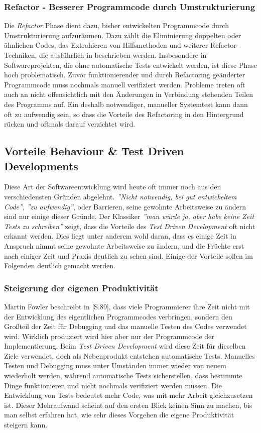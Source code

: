 \subsubsection{Refactor - Besserer Programmcode durch
  Umstrukturierung}
Die \textit{Refactor} Phase dient dazu, bisher entwickelten
Programmcode durch Umstrukturierung aufzuräumen. Dazu zählt die
Eliminierung doppelten oder ähnlichen Codes, das Extrahieren von
Hilfsmethoden und weiterer Refactor-Techniken, die ausführlich in
\cite{Fowler1999} beschrieben werden. Insbesondere in
Softwareprojekten, die ohne automatische Tests entwickelt werden, ist
diese Phase hoch problematisch. Zuvor funktionierender und durch
Refactoring geänderter Programmcode muss nochmals manuell verifiziert
werden. Probleme treten oft auch an nicht offensichtlich mit den
Änderungen in Verbindung stehenden Teilen des Programms auf. Ein
deshalb notwendiger, manueller Systemtest kann dann oft zu aufwendig
sein, so dass die Vorteile des Refactoring in den Hintergrund rücken
und oftmals darauf verzichtet wird.

\subsection{Vorteile Behaviour \& Test Driven Developments}
Diese Art der Softwareentwicklung wird heute oft immer noch aus den
verschiedensten Gründen abgelehnt. \textit{''Nicht notwendig, bei gut
  entwickeltem Code''}, \textit{''zu aufwendig''}, oder Barrieren,
seine gewohnte Arbeitsweise zu ändern sind nur einige dieser
Gründe. Der Klassiker \textit{''man würde ja, aber habe keine Zeit
  Tests zu schreiben''} zeigt, dass die Vorteile des \textit{Test
  Driven Development} oft nicht erkannt werden. Dies liegt unter
anderem wohl daran, dass es einige Zeit in Anspruch nimmt seine
gewohnte Arbeitsweise zu ändern, und die Früchte erst nach einiger
Zeit und Praxis deutlich zu sehen sind. Einige der Vorteile sollen im
Folgenden deutlich gemacht werden.

\subsubsection{Steigerung der eigenen Produktivität}
Martin Fowler beschreibt in \cite{Fowler1999}[S.89], dass viele
Programmierer ihre Zeit nicht mit der Entwicklung des eigentlichen
Programmcodes verbringen, sondern den Großteil der Zeit für Debugging
und das manuelle Testen des Codes verwendet wird. Wirklich produziert
wird hier aber nur der Programmcode der Implementierung. Beim
\textit{Test Driven Development} wird diese Zeit für dieselben Ziele
verwendet, doch als Nebenprodukt entstehen automatische
Tests. Manuelles Testen und Debugging muss unter Umständen immer
wieder von neuem wiederholt werden, während automatische Tests
sicherstellen, dass bestimmte Dinge funktionieren und nicht nochmals
verifiziert werden müssen. Die Entwicklung von Tests bedeutet mehr
Code, was mit mehr Arbeit gleichzusetzen ist. Dieser Mehraufwand
scheint auf den ersten Blick keinen Sinn zu machen, bis man selbst
erfahren hat, wie sehr dieses Vorgehen die eigene Produktivität
steigern kann.

